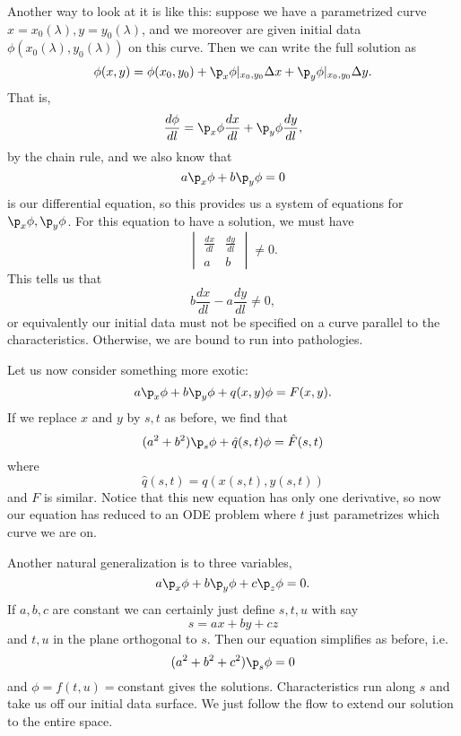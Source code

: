 Another way to look at it is like this: suppose we have a parametrized curve $x=x_0(\lambda),y=y_0(\lambda)$, and we moreover are given initial data
$\phi(x_0(\lambda),y_0(\lambda))$ on this curve. Then we can write the full solution as
\begin{equation}
    \phi(x,y) = \phi(x_0,y_0) + \p_x \phi|_{x_0,y_0} \Delta x + \p_y \phi|_{x_0,y_0} \Delta y.
\end{equation}
That is,
\begin{equation}
    \frac{d\phi}{dl} = \p_x \phi \frac{dx}{dl} + \p_y \phi \frac{dy}{dl},
\end{equation}
by the chain rule, and we also know that
\begin{equation}
    a\p_x \phi + b \p_y \phi =0
\end{equation}
is our differential equation, so this provides us a system of equations for $\p_x \phi, \p_y \phi$. For this equation to have a solution, we must have
\begin{equation}
    \begin{vmatrix}
        \frac{dx}{dl} & \frac{dy}{dl}\\
        a& b
    \end{vmatrix} \neq 0.
\end{equation}
This tells us that
\begin{equation}
    b\frac{dx}{dl} - a\frac{dy}{dl} \neq 0,
\end{equation}
or equivalently our initial data must not be specified on a curve parallel to the characteristics. Otherwise, we are bound to run into pathologies.

Let us now consider something more exotic:
\begin{equation}
    a\p_x \phi + b \p_y \phi + q(x,y) \phi = F(x,y).
\end{equation}
If we replace $x$ and $y$ by $s,t$ as before, we find that
\begin{equation}
    (a^2 +b^2) \p_s \phi + \hat q(s,t) \phi = \hat F(s,t)
\end{equation}
where
\begin{equation}
    \hat q(s,t) = q(x(s,t),y(s,t))
\end{equation}
and $F$ is similar. Notice that this new equation has only one derivative, so now our equation has reduced to an ODE problem where $t$ just parametrizes which curve we are on.

Another natural generalization is to three variables,
\begin{equation}
    a\p_x \phi  + b\p_y \phi + c\p_z \phi = 0.
\end{equation}
If $a,b,c$ are constant we can certainly just define $s,t,u$ with say
\begin{equation}
    s=ax +by + cz
\end{equation}
and $t,u$ in the plane orthogonal to $s$. Then our equation simplifies as before, i.e.
\begin{equation}
    (a^2+b^2+c^2) \p_s \phi =0
\end{equation}
and $\phi= f(t,u) ={}$constant gives the solutions. Characteristics run along $s$ and take us off our initial data surface. We just follow the flow to extend our solution to the entire space.

